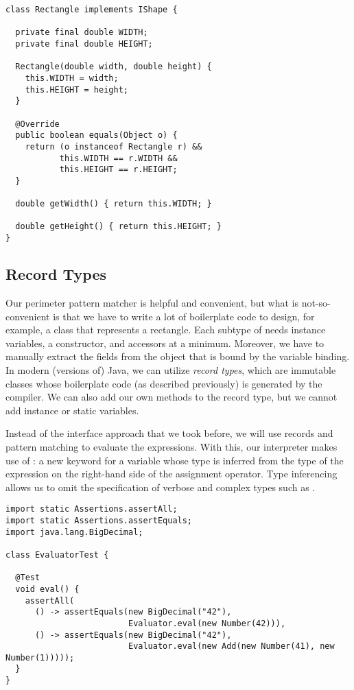 \begin{lstlisting}[language=MyJava]
class Rectangle implements IShape {

  private final double WIDTH;
  private final double HEIGHT;

  Rectangle(double width, double height) {
    this.WIDTH = width;
    this.HEIGHT = height;
  }

  @Override
  public boolean equals(Object o) {
    return (o instanceof Rectangle r) &&
           this.WIDTH == r.WIDTH &&
           this.HEIGHT == r.HEIGHT;
  }

  double getWidth() { return this.WIDTH; }

  double getHeight() { return this.HEIGHT; }
}
\end{lstlisting}


\subsection{Record Types}

Our perimeter pattern matcher is helpful and convenient, but what is not-so-convenient is that we have to write a lot of boilerplate code to design, for example, a class that represents a rectangle. 
Each subtype of  needs instance variables, a constructor, and accessors at a minimum. 
Moreover, we have to manually extract the fields from the object that is bound by the variable binding. 
In modern (versions of) Java, we can utilize \emph{record types}, which are immutable classes whose boilerplate code (as described previously) is generated by the compiler. 
We can also add our own methods to the record type, but we cannot add instance or static variables.

Instead of the interface approach that we took before, we will use records and pattern matching to evaluate the expressions. 
With this, our interpreter makes use of : a new keyword for a variable whose type is inferred from the type of the expression on the right-hand side of the assignment operator. 
Type inferencing allows us to omit the specification of verbose and complex types such as .

\begin{lstlisting}[language=MyJava]
import static Assertions.assertAll;
import static Assertions.assertEquals;
import java.lang.BigDecimal;

class EvaluatorTest {

  @Test
  void eval() {
    assertAll(
      () -> assertEquals(new BigDecimal("42"),
                         Evaluator.eval(new Number(42))),
      () -> assertEquals(new BigDecimal("42"),
                         Evaluator.eval(new Add(new Number(41), new Number(1)))));
  }
}
\end{lstlisting}

